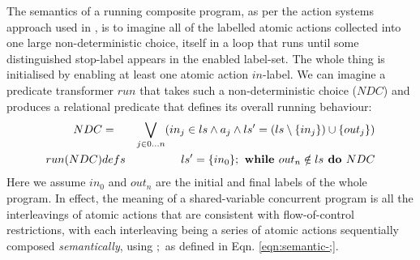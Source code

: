 The semantics of a running composite program,
as per the action systems approach used in \cite{DBLP:conf/icfem/WoodcockH02},
is to imagine all of the labelled atomic actions collected into one large
non-deterministic choice,
itself in a loop that runs until some distinguished stop-label appears
in the enabled label-set. The whole thing is initialised by enabling
at least one atomic action $in$-label.
We can imagine a predicate transformer $run$
that takes such a non-deterministic choice ($NDC$) and produces
a relational predicate that defines its overall running behaviour:
\begin{eqnarray}
   NDC
   &=&
   \bigvee_{j \in 0\dots n} (in_j \in ls
   \land
   a_j
   \land
   ls'=(ls\setminus\{{in_j}\})\cup\{{out_j}\})
\\ run(NDC)
   &defs&
   ls' = \{{in_0}\} ; \textbf{ while } out_n \notin ls \textbf{ do } NDC
\end{eqnarray}
Here we assume $in_0$ and $out_n$ are the initial and final labels of the whole
program.
In effect, the meaning of a shared-variable concurrent program
is all the interleavings of atomic actions that are consistent
with flow-of-control restrictions, with each interleaving
being a series of atomic actions sequentially composed \emph{semantically},
using $;$ as defined in Eqn. \ref{eqn:semantic-;}.

